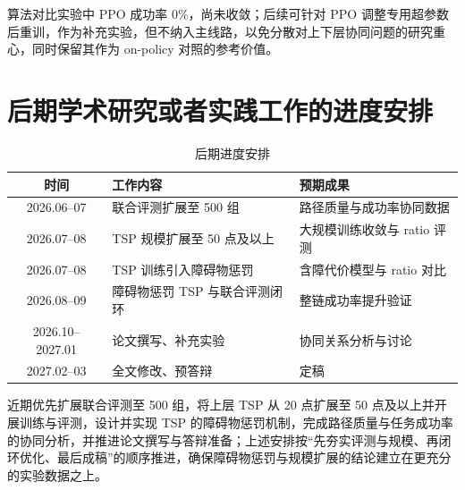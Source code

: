 算法对比实验中 PPO 成功率 0\%，尚未收敛；后续可针对 PPO 调整专用超参数后重训，作为补充实验，但不纳入主线路，以免分散对上下层协同问题的研究重心，同时保留其作为 on-policy 对照的参考价值。

\section{后期学术研究或者实践工作的进度安排}

\begin{table}[htbp]
  \centering
  \caption{后期进度安排}
  \label{tab:schedule}
  \begin{tabular}{clp{5.2cm}}
    \toprule
    时间 & 工作内容 & 预期成果 \\
    \midrule
    2026.06--07 & 联合评测扩展至 500 组 & 路径质量与成功率协同数据 \\
    2026.07--08 & TSP 规模扩展至 50 点及以上 & 大规模训练收敛与 ratio 评测 \\
    2026.07--08 & TSP 训练引入障碍物惩罚 & 含障代价模型与 ratio 对比 \\
    2026.08--09 & 障碍物惩罚 TSP 与联合评测闭环 & 整链成功率提升验证 \\
    2026.10--2027.01 & 论文撰写、补充实验 & 协同关系分析与讨论 \\
    2027.02--03 & 全文修改、预答辩 & 定稿 \\
    \bottomrule
  \end{tabular}
\end{table}

近期优先扩展联合评测至 500 组，将上层 TSP 从 20 点扩展至 50 点及以上并开展训练与评测，设计并实现 TSP 的障碍物惩罚机制，完成路径质量与任务成功率的协同分析，并推进论文撰写与答辩准备；上述安排按``先夯实评测与规模、再闭环优化、最后成稿''的顺序推进，确保障碍物惩罚与规模扩展的结论建立在更充分的实验数据之上。



